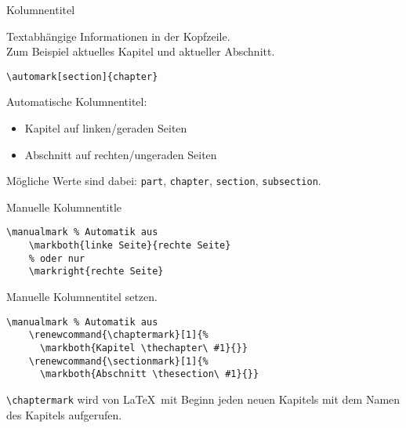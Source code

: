 \begin{Frame}[fragile]{Kolumnentitel}
  \begin{Definition}
    Textabhängige Informationen in der Kopfzeile.\\
    Zum Beispiel aktuelles Kapitel und aktueller Abschnitt.
  \end{Definition}

  \xxx

  \begin{lstlisting}[gobble=4]
    \automark[section]{chapter}
  \end{lstlisting}
  Automatische Kolumnentitel:
  \begin{itemize}
    \item Kapitel auf linken/geraden Seiten
    \item Abschnitt auf rechten/ungeraden Seiten
  \end{itemize}


  Mögliche Werte sind dabei: \lstinline-part-, \lstinline-chapter-,
  \lstinline-section-, \lstinline-subsection-.
\end{Frame}

\begin{Frame}[fragile]{Manuelle Kolumnentitle}
  \begin{lstlisting}[gobble=4]
    \manualmark % Automatik aus
    \markboth{linke Seite}{rechte Seite}
    % oder nur
    \markright{rechte Seite}
  \end{lstlisting}
  Manuelle Kolumnentitel setzen.

  \xxx

  \begin{lstlisting}[gobble=4]
    \manualmark % Automatik aus
    \renewcommand{\chaptermark}[1]{%
      \markboth{Kapitel \thechapter\ #1}{}}
    \renewcommand{\sectionmark}[1]{%
      \markboth{Abschnitt \thesection\ #1}{}}
  \end{lstlisting}
  \lstinline-\chaptermark- wird von \LaTeX\ mit Beginn
  jeden neuen Kapitels mit dem Namen des Kapitels aufgerufen.
\end{Frame}

